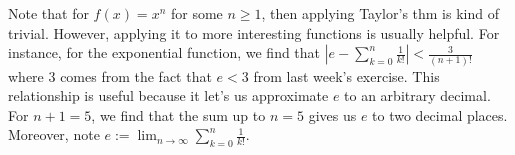 Note that for $f(x)=x^n$ for some $n\geq 1$, then applying Taylor's thm is kind of
trivial. However, applying it to more interesting functions is usually helpful. For
instance, for the exponential function, we find that $|e-\sum_{k=0}^{n}
\frac{1}{k!}| < \frac{3}{(n+1)!}$ where $3$ comes from the fact that $e<3$ from last week's
exercise. This relationship is useful because it let's us approximate $e$ to an arbitrary
decimal. For $n+1=5$, we find that the sum up to $n=5$ gives us $e$ to two decimal places.
Moreover, note $e:=\lim_{n\to\infty}\sum_{k=0}^n\frac{1}{k!}$.
